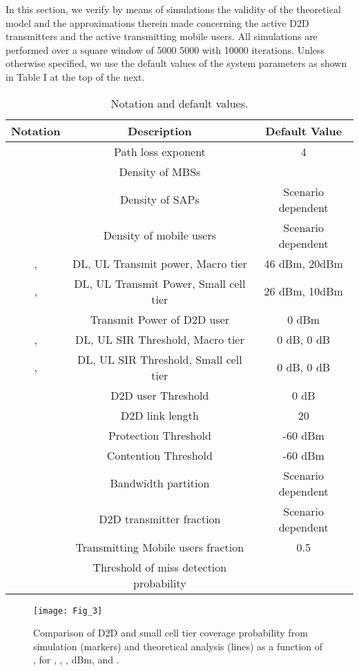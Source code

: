 \documentclass[twocolumn,english]{IEEEtran}
\providecommand{\tabularnewline}{\\}
\theoremstyle{plain}
\theoremstyle{definition}
\begin{document}
In this section, we verify by means of simulations the validity of
the theoretical model and the approximations therein made concerning
the active D2D transmitters and the active transmitting mobile users.
All simulations are performed over a square window of 5000 
5000  with 10000 iterations. Unless otherwise
specified, we use the default values of the system parameters as shown
in Table I at the top of the next.
\begin{table*}[t]
{\Large{}\protect\caption{\label{tab:Notation-and-default}Notation and default values.}
}{\Large \par}

\centering \begin{tabular}{|c|c|c|}
\hline
{\small{}Notation} & {\small{}Description} & {\small{}Default Value}\tabularnewline
\hline
\hline
 & {\small{}Path loss exponent} & {\small{}4}\tabularnewline
\hline
 & {\small{}Density of MBSs } & {\small{} }\tabularnewline
\hline
 & {\small{}Density of SAPs  } & {\small{}Scenario dependent}\tabularnewline
\hline
 & {\small{}Density of mobile users } & {\small{}Scenario dependent}\tabularnewline
\hline
,  & {\small{} DL, UL Transmit power, Macro tier} & {\small{}46 dBm, 20dBm}\tabularnewline
\hline
,  & {\small{}DL, UL Transmit Power, Small cell tier} & {\small{}26 dBm, 10dBm}\tabularnewline
\hline
  & {\small{}Transmit Power of D2D user} & {\small{}0 dBm}\tabularnewline
\hline
,  & {\small{}DL, UL SIR Threshold, Macro tier} & {\small{}0 dB, 0 dB}\tabularnewline
\hline
,  & {\small{}DL, UL SIR Threshold, Small cell tier} & {\small{}0 dB, 0 dB}\tabularnewline
\hline
 & {\small{}D2D user Threshold} & {\small{}0 dB}\tabularnewline
\hline
 & {\small{}D2D link length} & {\small{}20 }\tabularnewline
\hline
 & {\small{}Protection Threshold } & {\small{}-60 dBm}\tabularnewline
\hline
 & {\small{}Contention Threshold} & {\small{}-60 dBm}\tabularnewline
\hline
 & {\small{}Bandwidth partition } & {\small{}Scenario dependent}\tabularnewline
\hline
  & {\small{}D2D transmitter fraction } & {\small{}Scenario dependent}\tabularnewline
\hline
 & {\small{}Transmitting Mobile users fraction } & {\small{}0.5}\tabularnewline
\hline
 & {\small{}Threshold of miss detection probability} & {\small{}}\tabularnewline
\hline
\end{tabular}
\end{table*}
\begin{figure}[t]
\centering\texttt{[image: Fig\_3]}

\protect\caption{\label{fig:D2D_Small_cove_rho_s_d}Comparison of D2D and small cell
tier coverage probability from simulation (markers) and theoretical
analysis (lines) as a function of , for ,
, ,
 dBm, and .}
\end{figure}
\end{document}
